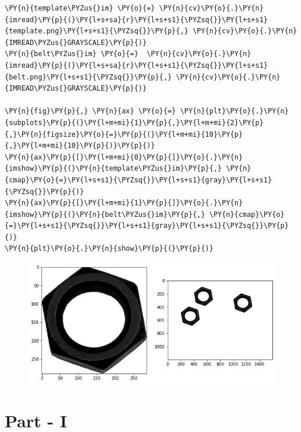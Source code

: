 \documentclass[a4paper,11pt]{article}%
\begin{document}
    \begin{tcolorbox}[breakable, size=fbox, boxrule=1pt, pad at break*=1mm,colback=cellbackground, colframe=cellborder]
\begin{Verbatim}[commandchars=\\\{\}]
\PY{n}{template\PYZus{}im} \PY{o}{=} \PY{n}{cv}\PY{o}{.}\PY{n}{imread}\PY{p}{(}\PY{l+s+sa}{r}\PY{l+s+s1}{\PYZsq{}}\PY{l+s+s1}{template.png}\PY{l+s+s1}{\PYZsq{}}\PY{p}{,} \PY{n}{cv}\PY{o}{.}\PY{n}{IMREAD\PYZus{}GRAYSCALE}\PY{p}{)}
\PY{n}{belt\PYZus{}im} \PY{o}{=}  \PY{n}{cv}\PY{o}{.}\PY{n}{imread}\PY{p}{(}\PY{l+s+sa}{r}\PY{l+s+s1}{\PYZsq{}}\PY{l+s+s1}{belt.png}\PY{l+s+s1}{\PYZsq{}}\PY{p}{,} \PY{n}{cv}\PY{o}{.}\PY{n}{IMREAD\PYZus{}GRAYSCALE}\PY{p}{)}

\PY{n}{fig}\PY{p}{,} \PY{n}{ax} \PY{o}{=} \PY{n}{plt}\PY{o}{.}\PY{n}{subplots}\PY{p}{(}\PY{l+m+mi}{1}\PY{p}{,}\PY{l+m+mi}{2}\PY{p}{,}\PY{n}{figsize}\PY{o}{=}\PY{p}{(}\PY{l+m+mi}{10}\PY{p}{,}\PY{l+m+mi}{10}\PY{p}{)}\PY{p}{)}
\PY{n}{ax}\PY{p}{[}\PY{l+m+mi}{0}\PY{p}{]}\PY{o}{.}\PY{n}{imshow}\PY{p}{(}\PY{n}{template\PYZus{}im}\PY{p}{,} \PY{n}{cmap}\PY{o}{=}\PY{l+s+s1}{\PYZsq{}}\PY{l+s+s1}{gray}\PY{l+s+s1}{\PYZsq{}}\PY{p}{)}
\PY{n}{ax}\PY{p}{[}\PY{l+m+mi}{1}\PY{p}{]}\PY{o}{.}\PY{n}{imshow}\PY{p}{(}\PY{n}{belt\PYZus{}im}\PY{p}{,} \PY{n}{cmap}\PY{o}{=}\PY{l+s+s1}{\PYZsq{}}\PY{l+s+s1}{gray}\PY{l+s+s1}{\PYZsq{}}\PY{p}{)}
\PY{n}{plt}\PY{o}{.}\PY{n}{show}\PY{p}{(}\PY{p}{)}
\end{Verbatim}
\end{tcolorbox}

    \begin{figure}[!h]
		\centering
    \includegraphics[scale=0.5]{figures/output_3_0.png}
    \end{figure}
  


\section{Part - I}
\end{document}

